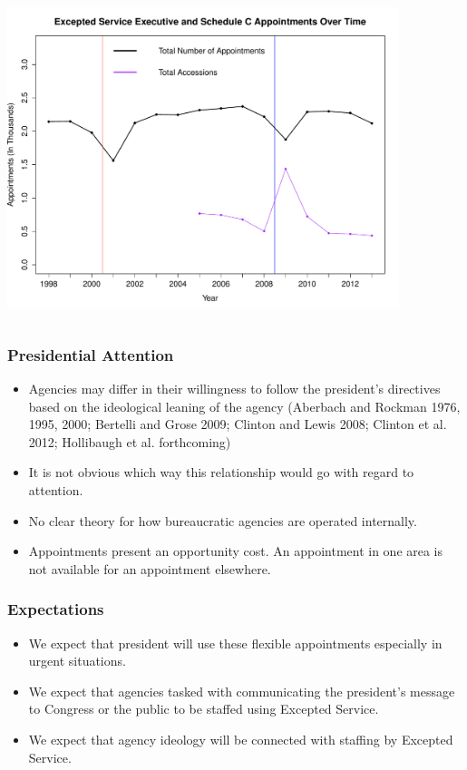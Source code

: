 \documentclass{beamer}
\begin{document}
\begin{frame}
\begin{center}
\includegraphics[height=3.7in,width=4.5in]{RPlot.pdf}
\end{center}
\end{frame}

\begin{frame}
\frametitle{Presidential Attention}
\begin{itemize}\addtolength{\itemsep}{1\baselineskip}
\item Agencies may differ in their willingness to follow the president's directives based on the ideological leaning of the agency (Aberbach and Rockman 1976, 1995, 2000; Bertelli and Grose 2009; Clinton and Lewis 2008; Clinton et al. 2012; Hollibaugh et al. forthcoming)
\item It is not obvious which way this relationship would go with regard to attention.
\item No clear theory for how bureaucratic agencies are operated internally.
\item Appointments present an opportunity cost. An appointment in one area is not available for an appointment elsewhere. 
\end{itemize}
\end{frame}

\begin{frame}
\frametitle{Expectations}

\begin{itemize}\addtolength{\itemsep}{1.5\baselineskip}
\item We expect that president will use these flexible appointments especially in urgent situations. 
\item We expect that agencies tasked with communicating the president's message to Congress or the public to be staffed using Excepted Service.
\item We expect that agency ideology will be connected with staffing by Excepted Service. 
\end{itemize}
\end{frame}
\end{document}
